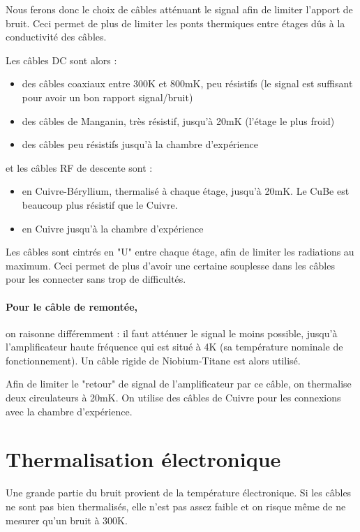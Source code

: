 \documentclass[a4paper,11pt]{report}
\begin{document}
Nous ferons donc le choix de câbles atténuant le signal afin de limiter l'apport de bruit. Ceci permet de plus de limiter les ponts thermiques entre étages dûs à la conductivité des câbles.
\newline

Les câbles DC sont alors :
\begin{itemize}
    \item des câbles coaxiaux entre 300K et 800mK, peu résistifs (le signal est suffisant pour avoir un bon rapport signal/bruit)
    \item des câbles de Manganin, très résistif, jusqu'à 20mK (l'étage le plus froid)
    \item des câbles peu résistifs jusqu'à la chambre d'expérience
\end{itemize}

et les câbles RF de descente sont :
\begin{itemize}
    \item en Cuivre-Béryllium, thermalisé à chaque étage, jusqu'à 20mK. Le CuBe est beaucoup plus résistif que le Cuivre.
    \item en Cuivre jusqu'à la chambre d'expérience
\end{itemize}

Les câbles sont cintrés en "U" entre chaque étage, afin de limiter les radiations au maximum. Ceci permet de plus d'avoir une certaine souplesse dans les câbles pour les connecter sans trop de difficultés.

\paragraph*{Pour le câble de remontée,} on raisonne différemment : il faut atténuer le signal le moins possible, jusqu'à l'amplificateur haute fréquence qui est situé à 4K (sa température nominale de fonctionnement). Un câble rigide de Niobium-Titane est alors utilisé.

Afin de limiter le "retour" de signal de l'amplificateur par ce câble, on thermalise deux circulateurs à 20mK. On utilise des câbles de Cuivre pour les connexions avec la chambre d'expérience.

\section{Thermalisation électronique}
Une grande partie du bruit provient de la température électronique. Si les câbles ne sont pas bien thermalisés, elle n'est pas assez faible et on risque même de ne mesurer qu'un bruit à 300K.
\end{document}
